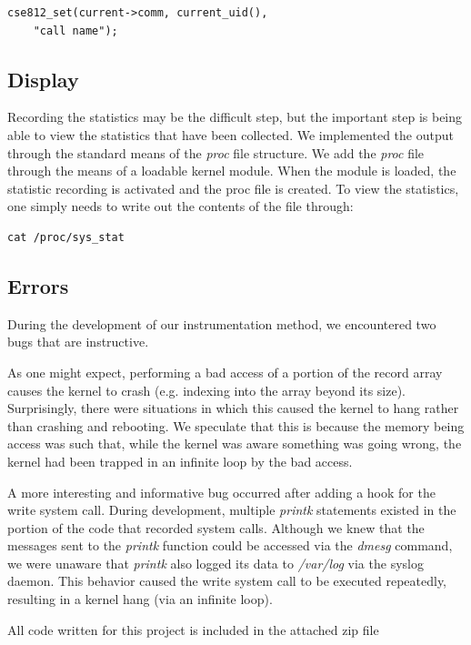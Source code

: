 \documentclass[conference]{IEEEtran}
\begin{document}
\begin{verbatim}
cse812_set(current->comm, current_uid(),
    "call name");
\end{verbatim}

\subsection{Display}
Recording the statistics may be the difficult step, but the important step is being able to view the statistics that have been collected.
We implemented the output through the standard means of the \textit{proc} file structure.
We add the \textit{proc} file through the means of a loadable kernel module.
When the module is loaded, the statistic recording is activated and the proc file is created.
To view the statistics, one simply needs to write out the contents of the file through:

\begin{verbatim}
cat /proc/sys_stat
\end{verbatim}

\subsection{Errors}
During the development of our instrumentation method, we encountered two bugs that are instructive.

As one might expect, performing a bad access of a portion of the record array causes the kernel to crash (e.g. indexing into the array beyond its size).
Surprisingly, there were situations in which this caused the kernel to hang rather than crashing and rebooting.
We speculate that this is because the memory being access was such that, while the kernel was aware something was going wrong, the kernel had been trapped in an infinite loop by the bad access.

A more interesting and informative bug occurred after adding a hook for the write system call.
During development, multiple \textit{printk} statements existed in the portion of the code that recorded system calls.
Although we knew that the messages sent to the \textit{printk} function could be accessed via the \textit{dmesg} command, we were unaware that \textit{printk} also logged its data to \textit{/var/log} via the syslog daemon.
This behavior caused the write system call to be executed repeatedly, resulting in a kernel hang (via an infinite loop).

All code written for this project is included in the attached zip file
\end{document}
